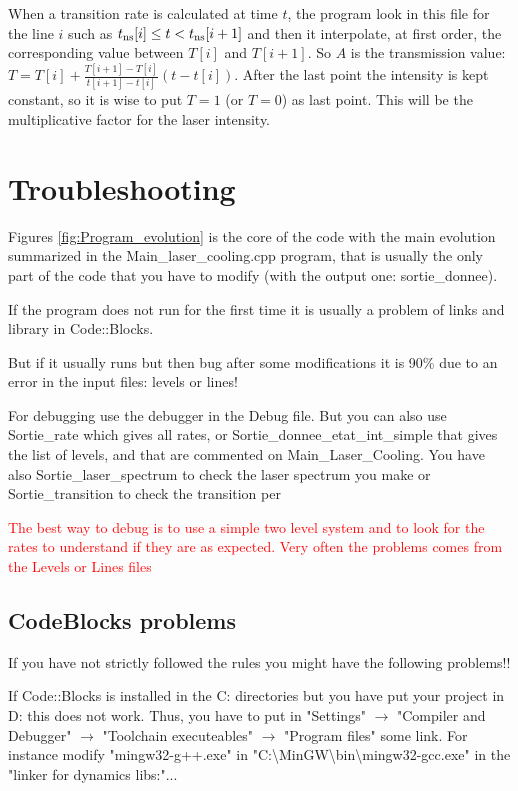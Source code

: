 \documentclass[amsmath,amssymb,nofootinbib]{revtex4-2}
\begin{document}
When a transition rate is calculated at time $t$, the program look in this file for the line $i$ such as  $t_{\rm ns}[i] \leq t < t_{\rm ns}[i+1]$ and then it interpolate, at first order, the corresponding value between
$T[i]$ and $T[i+1]$. So $A$ is the transmission value:
$T = T[i] + \frac{T[i+1]-T[i]}{t[i+1]-t[i]}(t-t[i])$. After the last point the intensity is kept constant, so it is wise to put $T=1$ (or $T=0$) as last point.
This will be the multiplicative factor for the laser intensity.



\section{Troubleshooting}


Figures \ref{fig:Program_evolution} is the core of the code with the main evolution summarized in the Main\_laser\_cooling.cpp program, that is usually the only part of the code that you have to modify (with the output one: sortie\_donnee).


If the program does not run for the first time it is usually a problem of links and library in Code::Blocks.

But if it usually runs but then bug after some modifications it is 90\% due to an error in the input files: levels or lines!


For debugging use the debugger in the Debug file. But you can also use  Sortie\_rate  which gives all rates, or Sortie\_donnee\_etat\_int\_simple that gives the list of levels, and that are commented on Main\_Laser\_Cooling. You have also Sortie\_laser\_spectrum to check the laser spectrum you make or Sortie\_transition to check the transition per

\textcolor{red}{The best way to debug is to use a simple two level system and to look for the rates to understand if they are as expected. Very often the problems comes from the Levels or Lines files}


\subsection{CodeBlocks problems}

If you have not strictly followed the rules you might have the following problems!!


If Code::Blocks is installed in the  C: directories but you have put your project in D: 
this does not work.
Thus, you have to put in
"Settings" $\rightarrow$ "Compiler and Debugger" $\rightarrow$ "Toolchain executeables" $\rightarrow$ "Program files"
some link.
For instance modify "mingw32-g++.exe" in "C:\textbackslash{}MinGW\textbackslash{}bin\textbackslash{}mingw32-gcc.exe" 
in the "linker for dynamics libs:"...
\end{document}
